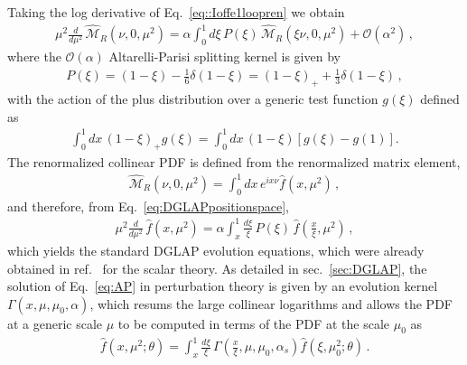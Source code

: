 Taking the log derivative of Eq.~\eqref{eq::Ioffe1loopren} we obtain
\begin{align}
        \label{eq:DGLAPpositionspace}
        \mu^2\frac{d}{d\mu^2}\, \widehat{\mathcal{M}}_R\left(\nu,0,\mu^2\right) 
        = \alpha\int_0^1 d\xi\,P\left(\xi\right)\,\widehat{\mathcal{M}}_R\left(\xi\nu,0,\mu^2\right) 
        + \mathcal{O}\left(\alpha^2\right)\, ,
\end{align}
where the $\mathcal{O}\left(\alpha\right)$ Altarelli-Parisi splitting kernel is given by
\begin{align}
        \label{eq:AltarelliParisikernel}
        P\left(\xi\right) = 
        \left(1-\xi\right) - \frac{1}{6}\delta\left(1-\xi\right) = 
        \left(1-\xi\right)_+ + \frac{1}{3}\delta\left(1-\xi\right)\, ,
\end{align}
with the action of the plus distribution over a generic test function $g\left(\xi\right)$ defined as
\begin{align}
	\label{eq:plus}
	\int_0^1 dx\,\left(1-\xi\right)_+g\left(\xi\right) = \int_0^1 dx\,\left(1-\xi\right)\left[g\left(\xi\right) - g\left(1\right)\right].
\end{align}
The renormalized collinear PDF is defined from the renormalized matrix element,
\begin{align}
        \label{eq::PDFs}
        \widehat{\mathcal{M}}_R\left(\nu,0,\mu^2\right) = 
        \int_{0}^{1} dx \, e^{ix\nu}\widehat{f}\left(x,\mu^2\right)\, ,
\end{align}
and therefore, from Eq.~\eqref{eq:DGLAPpositionspace},
\begin{align}
        \label{eq:AP}
        \mu^2\frac{d}{d\mu^2}\, \widehat{f}\left(x, \mu^2\right) = 
        \alpha \int_{x}^{1} \frac{d\xi}{\xi}\,P\left(\xi\right)\,\widehat{f}\left(\frac{x}{\xi}, \mu^2\right)\, ,
\end{align}
which yields the standard DGLAP evolution equations, which were already obtained
in ref.~\cite{Collins:1980ui} for the scalar theory. As detailed in sec.~\ref{sec:DGLAP}, the solution of
Eq.~\eqref{eq:AP} in perturbation theory is given by an evolution kernel
$\Gamma\left(x,\mu,\mu_0,\alpha\right)$, which resums the large collinear logarithms and allows the PDF at a generic scale
$\mu$ to be computed in terms of the PDF at the scale $\mu_0$ as
\begin{align}
        \label{eq:solutionDGLAP}
	\widehat{f}\left(x,\mu^2; \theta\right) = \int_x^1 \frac{d\xi}{\xi}\,\Gamma\left(\frac{x}{\xi},\mu,\mu_0,\alpha_s\right)
	\widehat{f}\left(\xi,\mu_0^2; \theta\right)\, .
\end{align}
%

